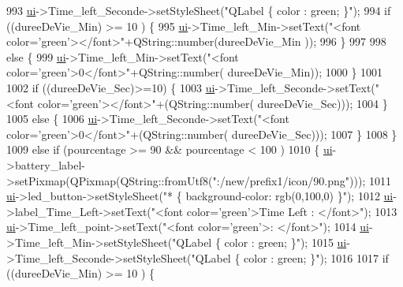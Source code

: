 \begin{DoxyCode}
{993               \hyperlink{a00008_a6dc041ef6a2ffb329928d2913e8344e6}{ui}->Time\_left\_Seconde->setStyleSheet(\textcolor{stringliteral}{"QLabel \{ color : green; \}"});
994               \textcolor{keywordflow}{if} ((dureeDeVie\_Min) >=  10 ) \{
995                   \hyperlink{a00008_a6dc041ef6a2ffb329928d2913e8344e6}{ui}->Time\_left\_Min->setText(\textcolor{stringliteral}{"<font color='green'></font>"}+QString::number(dureeDeVie\_Min
      ));
996               \}
997 
998               \textcolor{keywordflow}{else} \{
999                   \hyperlink{a00008_a6dc041ef6a2ffb329928d2913e8344e6}{ui}->Time\_left\_Min->setText(\textcolor{stringliteral}{"<font color='green'>0</font>"}+QString::number(
      dureeDeVie\_Min));
1000               \}
1001 
1002               \textcolor{keywordflow}{if} ((dureeDeVie\_Sec)>=10) \{
1003                   \hyperlink{a00008_a6dc041ef6a2ffb329928d2913e8344e6}{ui}->Time\_left\_Seconde->setText(\textcolor{stringliteral}{"<font color='green'></font>"}+(QString::number(
      dureeDeVie\_Sec)));
1004               \}
1005               \textcolor{keywordflow}{else} \{
1006                   \hyperlink{a00008_a6dc041ef6a2ffb329928d2913e8344e6}{ui}->Time\_left\_Seconde->setText(\textcolor{stringliteral}{"<font color='green'>0</font>"}+(QString::number(
      dureeDeVie\_Sec)));
1007               \}
1008           \}
1009           \textcolor{keywordflow}{else} \textcolor{keywordflow}{if} (pourcentage >= 90 && pourcentage < 100 )
1010           \{   \hyperlink{a00008_a6dc041ef6a2ffb329928d2913e8344e6}{ui}->battery\_label->setPixmap(QPixmap(QString::fromUtf8(\textcolor{stringliteral}{":/new/prefix1/icon/90.png"})));
1011               \hyperlink{a00008_a6dc041ef6a2ffb329928d2913e8344e6}{ui}->led\_button->setStyleSheet(\textcolor{stringliteral}{"* \{ background-color: rgb(0,100,0) \}"});
1012               \hyperlink{a00008_a6dc041ef6a2ffb329928d2913e8344e6}{ui}->label\_Time\_Left->setText(\textcolor{stringliteral}{"<font color='green'>Time Left : </font>"});
1013               \hyperlink{a00008_a6dc041ef6a2ffb329928d2913e8344e6}{ui}->Time\_left\_point->setText(\textcolor{stringliteral}{"<font color='green'>: </font>"});
1014               \hyperlink{a00008_a6dc041ef6a2ffb329928d2913e8344e6}{ui}->Time\_left\_Min->setStyleSheet(\textcolor{stringliteral}{"QLabel \{ color : green; \}"});
1015               \hyperlink{a00008_a6dc041ef6a2ffb329928d2913e8344e6}{ui}->Time\_left\_Seconde->setStyleSheet(\textcolor{stringliteral}{"QLabel \{ color : green; \}"});
1016 
1017               \textcolor{keywordflow}{if} ((dureeDeVie\_Min) >=  10 ) \{
}
\end{DoxyCode}
